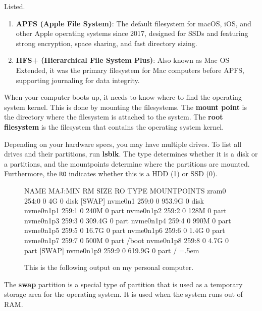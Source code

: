 \documentclass{article}
\newenvironment{cverbatim}
    {\SaveVerbatim{cverb}}
    {\endSaveVerbatim
    \flushleft\fboxrule=0pt\fboxsep=.5em
    \colorbox{cverbbg}{%
      \makebox[\dimexpr\linewidth-2\fboxsep][l]{\BUseVerbatim{cverb}}%
    }
    \endflushleft
  }
\begin{document}
  \begin{example}
    Listed. 
    \begin{enumerate}
      \item \textbf{APFS (Apple File System)}: The default filesystem for macOS, iOS, and other Apple operating systems since 2017, designed for SSDs and featuring strong encryption, space sharing, and fast directory sizing.
      \item \textbf{HFS+ (Hierarchical File System Plus)}: Also known as Mac OS Extended, it was the primary filesystem for Mac computers before APFS, supporting journaling for data integrity.
    \end{enumerate}
  \end{example}

  When your computer boots up, it needs to know where to find the operating system kernel. This is done by mounting the filesystems. The \textbf{mount point} is the directory where the filesystem is attached to the system. The \textbf{root filesystem} is the filesystem that contains the operating system kernel.

  Depending on your hardware specs, you may have multiple drives. To list all drives and their partitions, run \textbf{lsblk}. The type determines whether it is a disk or a partitions, and the mountpoints determine where the partitions are mounted. Furthermore, the \texttt{RO} indicates whether this is a HDD (1) or SSD (0). 

\begin{figure}[hbt!]
  \centering 
  \begin{cverbatim} 
  NAME        MAJ:MIN RM   SIZE RO TYPE MOUNTPOINTS
  zram0       254:0    0     4G  0 disk [SWAP]
  nvme0n1     259:0    0 953.9G  0 disk 
    nvme0n1p1 259:1    0   240M  0 part 
    nvme0n1p2 259:2    0   128M  0 part 
    nvme0n1p3 259:3    0 309.4G  0 part 
    nvme0n1p4 259:4    0   990M  0 part 
    nvme0n1p5 259:5    0  16.7G  0 part 
    nvme0n1p6 259:6    0   1.4G  0 part 
    nvme0n1p7 259:7    0   500M  0 part /boot
    nvme0n1p8 259:8    0   4.7G  0 part [SWAP]
    nvme0n1p9 259:9    0 619.9G  0 part /
  \end{cverbatim}
  \caption{This is the following output on my personal computer. } 
  \label{fig:lsblk}
\end{figure}
  
  The \textbf{swap} partition is a special type of partition that is used as a temporary storage area for the operating system. It is used when the system runs out of RAM. 
\end{document}

